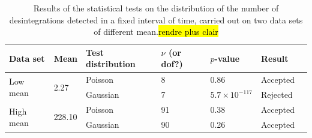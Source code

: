 \begin{table}[htbp]
    \centering
    \begin{tabular}{lllllll}
        \hline
        Data set & Mean & Test distribution & $\nu$ (or dof?) & $p$-value & Result \\
        \hline
        \multirow{2}{*}{Low mean} & \multirow{2}{*}{2.27} & Poisson & 8 & 0.86 & Accepted\\
        & & Gaussian & 7 & $5.7 \times 10^{-117}$ & Rejected \\
        \multirow{2}{*}{High mean} & \multirow{2}{*}{228.10} & Poisson & 91 & 0.38 & Accepted\\
        & & Gaussian & 90 & 0.26 & Accepted\\
        \hline
    \end{tabular}
    \caption{Results of the statistical tests on the distribution of the number of desintegrations detected in a fixed interval of time, carried out on two data sets of different mean.\hl{rendre plus clair} }
    \label{tab:statistical_tests}
\end{table}


